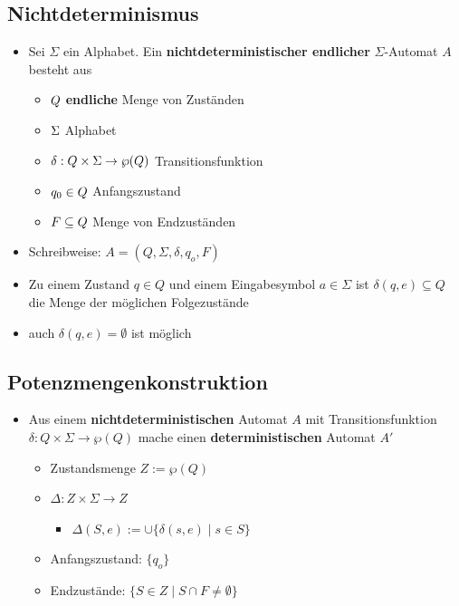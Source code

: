\documentclass{scrartcl}
\begin{document}
\subsection{Nichtdeterminismus}

\begin{itemize}
	\item Sei $\Sigma$ ein Alphabet. Ein \textbf{nichtdeterministischer endlicher} $\Sigma$-Automat $A$ besteht aus
	\begin{itemize}
		\item $Q \hfill$ \textbf{endliche} Menge von Zuständen
		\item $\Sigma \hfill$ Alphabet
		\item $\delta: Q \times \Sigma \rightarrow \wp(Q) \hfill$ Transitionsfunktion
		\item $q_0 \in Q \hfill$ Anfangszustand
		\item $F \subseteq Q \hfill$ Menge von Endzuständen
	\end{itemize}
	\item Schreibweise: $A = (Q, \Sigma, \delta, q_o, F)$
	\item Zu einem Zustand $q \in Q$ und einem Eingabesymbol $a \in \Sigma$ ist $\delta(q,e) \subseteq Q$ die Menge der möglichen Folgezustände
	\item auch $\delta(q,e) = \emptyset$ ist möglich
\end{itemize}

\subsection{Potenzmengenkonstruktion}

\begin{itemize}
	\item Aus einem \textbf{nichtdeterministischen} Automat $A$ mit Transitionsfunktion \\ $\delta: Q \times \Sigma \rightarrow \wp(Q)$ mache einen \textbf{deterministischen} Automat $A'$
	\begin{itemize}
		\item Zustandsmenge $Z := \wp(Q)$
		\item $\Delta: Z \times \Sigma \rightarrow Z$
		\begin{itemize}
			\item $\Delta(S,e) := \cup \{ \delta(s,e) \mid s \in S \}$
		\end{itemize}
		\item Anfangszustand: $\{ q_o \}$
		\item Endzustände: $\{ S \in Z \mid S \cap F \neq \emptyset \}$
	\end{itemize}
\end{itemize}
\end{document}
